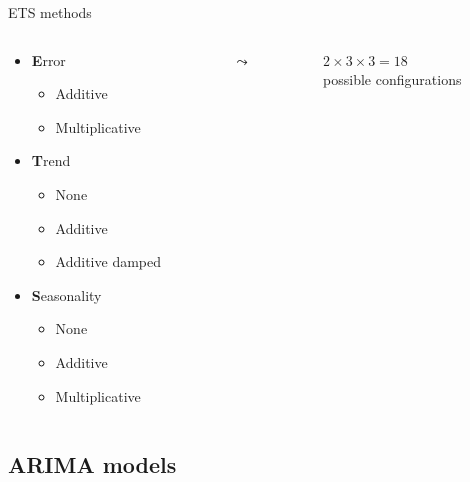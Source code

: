 \documentclass[12pt,aspectratio=169]{beamer}
\begin{document}
\begin{frame}{ETS methods}
    \begin{columns}
        \begin{column}{0.475\textwidth}
            \begin{itemize}
                \item \alert{\textbf{E}rror}
                      \begin{itemize}
                          \item Additive
                          \item Multiplicative
                      \end{itemize}
                \item \textbf{T}rend
                      \begin{itemize}
                          \item None
                          \item Additive
                          \item Additive damped
                      \end{itemize}
                \item \textbf{S}easonality
                      \begin{itemize}
                          \item None
                          \item Additive
                          \item Multiplicative
                      \end{itemize}
            \end{itemize}
        \end{column}
        \begin{column}{0.05\textwidth}
            $\leadsto$
        \end{column}
        \begin{column}{0.475\textwidth}
            \centering%
            $2 \times 3 \times 3 = 18$ \\
            possible configurations
        \end{column}
    \end{columns}
\end{frame}

\subsection{ARIMA models}
\end{document}
